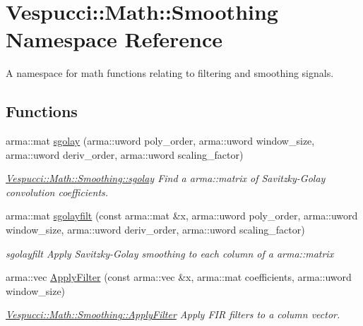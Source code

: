 \hypertarget{namespace_vespucci_1_1_math_1_1_smoothing}{\section{Vespucci\+:\+:Math\+:\+:Smoothing Namespace Reference}
\label{namespace_vespucci_1_1_math_1_1_smoothing}
}


A namespace for math functions relating to filtering and smoothing signals.  


\subsection*{Functions}
\begin{DoxyCompactItemize}
\item 
arma\+::mat \hyperlink{namespace_vespucci_1_1_math_1_1_smoothing_a0fb8087861e1d4b8f05dd4dff3cdb012}{sgolay} (arma\+::uword poly\+\_\+order, arma\+::uword window\+\_\+size, arma\+::uword deriv\+\_\+order, arma\+::uword scaling\+\_\+factor)
\begin{DoxyCompactList}\small\item\em \hyperlink{namespace_vespucci_1_1_math_1_1_smoothing_a0fb8087861e1d4b8f05dd4dff3cdb012}{Vespucci\+::\+Math\+::\+Smoothing\+::sgolay} Find a arma\+::matrix of Savitzky-\/\+Golay convolution coefficients. \end{DoxyCompactList}\item 
arma\+::mat \hyperlink{namespace_vespucci_1_1_math_1_1_smoothing_a2cb17f59d170c1ca2437b264d13626b6}{sgolayfilt} (const arma\+::mat \&x, arma\+::uword poly\+\_\+order, arma\+::uword window\+\_\+size, arma\+::uword deriv\+\_\+order, arma\+::uword scaling\+\_\+factor)
\begin{DoxyCompactList}\small\item\em sgolayfilt Apply Savitzky-\/\+Golay smoothing to each column of a arma\+::matrix \end{DoxyCompactList}\item 
arma\+::vec \hyperlink{namespace_vespucci_1_1_math_1_1_smoothing_aa38f2ef278486993ec066ff5701bec62}{Apply\+Filter} (const arma\+::vec \&x, arma\+::mat coefficients, arma\+::uword window\+\_\+size)
\begin{DoxyCompactList}\small\item\em \hyperlink{namespace_vespucci_1_1_math_1_1_smoothing_aa38f2ef278486993ec066ff5701bec62}{Vespucci\+::\+Math\+::\+Smoothing\+::\+Apply\+Filter} Apply F\+I\+R filters to a column vector. \end{DoxyCompactList}\item 

\end{DoxyCompactItemize}
